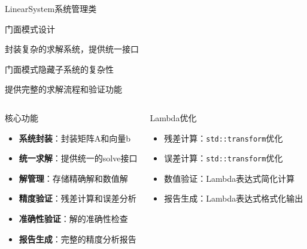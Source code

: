 \documentclass[UTF8,aspectratio=169]{beamer}
\begin{document}
\begin{frame}{LinearSystem系统管理类}
    \begin{ytublock}{门面模式设计}
        \item 封装复杂的求解系统，提供统一接口
        \item 门面模式隐藏子系统的复杂性
        \item 提供完整的求解流程和验证功能
    \end{ytublock}

    \begin{columns}
        \begin{block}{核心功能}
            \begin{itemize}
                \item \textbf{系统封装}：封装矩阵A和向量b
                \item \textbf{统一求解}：提供统一的solve接口
                \item \textbf{解管理}：存储精确解和数值解
                \item \textbf{精度验证}：残差计算和误差分析
                \item \textbf{准确性验证}：解的准确性检查
                \item \textbf{报告生成}：完整的精度分析报告
            \end{itemize}
        \end{block}

        \begin{block}{Lambda优化}
            \begin{itemize}
                \item 残差计算：\texttt{std::transform}优化
                \item 误差计算：\texttt{std::transform}优化
                \item 数值验证：Lambda表达式简化计算
                \item 报告生成：Lambda表达式格式化输出
            \end{itemize}
        \end{block}
    \end{columns}
\end{frame}
\end{document}

